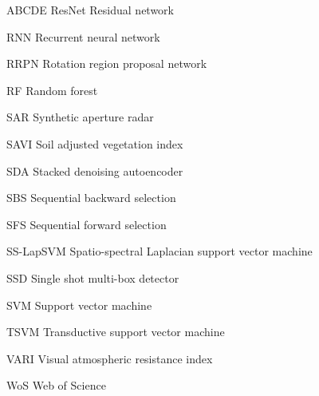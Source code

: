 \begin{seznamzkratek}{ABCDE}
	      {ResNet}
	      {Residual network}

	      {RNN}
	      {Recurrent neural network}

	      {RRPN}
	      {Rotation region proposal network}

	      {RF}
	      {Random forest}

	      {SAR}
	      {Synthetic aperture radar}

	      {SAVI}
	      {Soil adjusted vegetation index}

	      {SDA}
	      {Stacked denoising autoencoder}

	      {SBS}
	      {Sequential backward selection}

	      {SFS}
	      {Sequential forward selection}

	      {SS-LapSVM}
	      {Spatio-spectral Laplacian support vector machine}

	      {SSD}
	      {Single shot multi-box detector}

	      {SVM}
	      {Support vector machine}

	      {TSVM}
	      {Transductive support vector machine}

	      {VARI}
	      {Visual atmospheric resistance index}

	      {WoS}
	      {Web of Science}
	      
\end{seznamzkratek}
